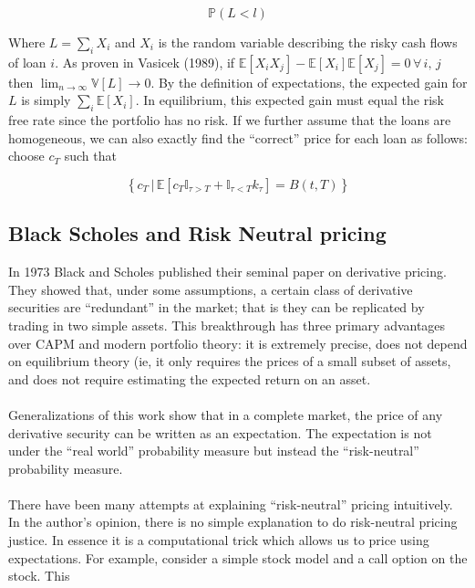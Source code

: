 \documentclass{article}
\theoremstyle{definition}
\begin{document}
\begin{equation}
\mathbb{P}(L<l)
\end{equation}

Where \(L=\sum_i X_i \) and \(X_i\) is the random variable describing the risky cash flows of loan \(i\).  As proven in Vasicek (1989), if \(\mathbb{E}[X_iX_j]-\mathbb{E}[X_i]\mathbb{E}[X_j]=0\,\forall\,i,\,j\) then \( \lim_{n \to \infty}\mathbb{V}[L] \to 0\).  By the definition of expectations, the expected gain for \(L\) is simply \(\sum_i \mathbb{E}[X_i]\).  In equilibrium, this expected gain must equal the risk free rate since the portfolio has no risk.  If we further assume that the loans are homogeneous, we can also exactly find the ``correct'' price for each loan as follows: choose \(c_T\) such that

\[
\left\{c_T \,|\, \mathbb{E}\left[ c_T \mathbb{I}_{\tau>T}+\mathbb{I}_{\tau<T} k_\tau \right]=B(t, T)\right\}
\]

\subsection{Black Scholes and Risk Neutral pricing}

In 1973 Black and Scholes published their seminal paper on derivative pricing.  They showed that, under some assumptions, a certain class of derivative securities are ``redundant'' in the market; that is they can be replicated by trading in two simple assets.  This breakthrough has three primary advantages over CAPM and modern portfolio theory: it is extremely precise, does not depend on equilibrium theory (ie, it only requires the prices of a small subset of assets, and does not require estimating the expected return on an asset.  
\\
\\
Generalizations of this work show that in a complete market, the price of any derivative security can be written as an expectation.  The expectation is not under the ``real world'' probability measure but instead the ``risk-neutral'' probability measure.  
\\
\\
There have been many attempts at explaining ``risk-neutral'' pricing intuitively.  In the author's opinion, there is no simple explanation to do risk-neutral pricing justice.  In essence it is a computational trick which allows us to price using expectations.  For example, consider a simple stock model and a call option on the stock.  This 
\end{document}
